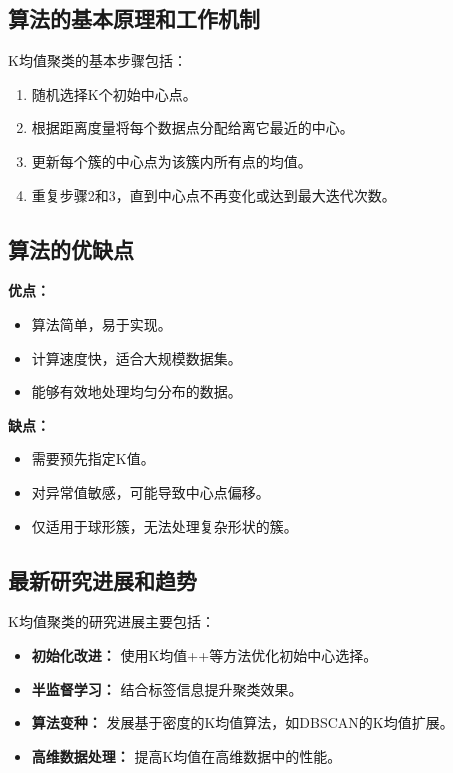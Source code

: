 \subsection*{算法的基本原理和工作机制}
K均值聚类的基本步骤包括：
\begin{enumerate}
    \item 随机选择K个初始中心点。
    \item 根据距离度量将每个数据点分配给离它最近的中心。
    \item 更新每个簇的中心点为该簇内所有点的均值。
    \item 重复步骤2和3，直到中心点不再变化或达到最大迭代次数。
\end{enumerate}

\subsection*{算法的优缺点}
\textbf{优点：}
\begin{itemize}
    \item 算法简单，易于实现。
    \item 计算速度快，适合大规模数据集。
    \item 能够有效地处理均匀分布的数据。
\end{itemize}

\textbf{缺点：}
\begin{itemize}
    \item 需要预先指定K值。
    \item 对异常值敏感，可能导致中心点偏移。
    \item 仅适用于球形簇，无法处理复杂形状的簇。
\end{itemize}

\subsection*{最新研究进展和趋势}
K均值聚类的研究进展主要包括：
\begin{itemize}
    \item \textbf{初始化改进：} 使用K均值++等方法优化初始中心选择。
    \item \textbf{半监督学习：} 结合标签信息提升聚类效果。
    \item \textbf{算法变种：} 发展基于密度的K均值算法，如DBSCAN的K均值扩展。
    \item \textbf{高维数据处理：} 提高K均值在高维数据中的性能。
\end{itemize}
